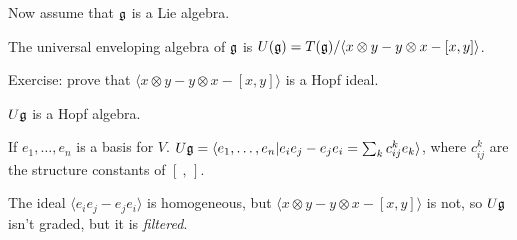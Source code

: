   Now assume that $\mathfrak{g}$ is a Lie algebra.
  \begin{definition}
    The universal enveloping algebra of $\mathfrak{g}$ is $U(\mathfrak{g}) = T(\mathfrak{g})/\langle x\otimes
    y-y\otimes x - [x,y]\rangle$.
  \end{definition}
    Exercise: prove that $\langle x\otimes y-y\otimes x - [x,y]\rangle$ is a Hopf
    ideal.
  \begin{corollary}
    $U\mathfrak{g}$ is a Hopf algebra.
  \end{corollary}

  If $e_1,\dots, e_n$ is a basis for $V$. $U\mathfrak{g} = \langle e_1,\dots, e_n| e_ie_j-e_je_i
  = \sum_k c_{ij}^k e_k\rangle$, where $c_{ij}^k$ are the structure constants of $[\ ,\,]$.
  \begin{remark}
    The ideal $\langle e_ie_j-e_je_i\rangle$ is homogeneous, but $\langle x\otimes
 y-y\otimes x -
    [x,y]\rangle$ is not, so $U\mathfrak{g}$ isn't graded, but it is \emph{filtered}.
  \end{remark}

